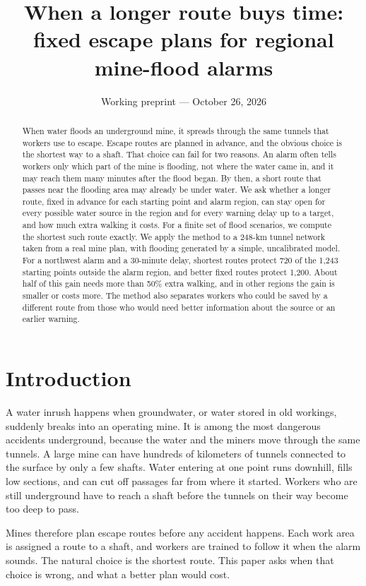 \documentclass[11pt,a4paper]{article}
\title{When a longer route buys time:\\fixed escape plans for regional mine-flood alarms}
\author{}
\date{Working preprint --- October 26, 2026}
\begin{document}
\maketitle
\begin{abstract}
When water floods an underground mine, it spreads through the same tunnels that workers use to escape. Escape routes are planned in advance, and the obvious choice is the shortest way to a shaft. That choice can fail for two reasons. An alarm often tells workers only which part of the mine is flooding, not where the water came in, and it may reach them many minutes after the flood began. By then, a short route that passes near the flooding area may already be under water. We ask whether a longer route, fixed in advance for each starting point and alarm region, can stay open for every possible water source in the region and for every warning delay up to a target, and how much extra walking it costs. For a finite set of flood scenarios, we compute the shortest such route exactly. We apply the method to a 248-km tunnel network taken from a real mine plan, with flooding generated by a simple, uncalibrated model. For a northwest alarm and a 30-minute delay, shortest routes protect 720 of the 1,243 starting points outside the alarm region, and better fixed routes protect 1,200. About half of this gain needs more than 50\% extra walking, and in other regions the gain is smaller or costs more. The method also separates workers who could be saved by a different route from those who would need better information about the source or an earlier warning.
\end{abstract}

\section{Introduction}
A water inrush happens when groundwater, or water stored in old workings, suddenly breaks into an operating mine. It is among the most dangerous accidents underground, because the water and the miners move through the same tunnels. A large mine can have hundreds of kilometers of tunnels connected to the surface by only a few shafts. Water entering at one point runs downhill, fills low sections, and can cut off passages far from where it started. Workers who are still underground have to reach a shaft before the tunnels on their way become too deep to pass.

Mines therefore plan escape routes before any accident happens. Each work area is assigned a route to a shaft, and workers are trained to follow it when the alarm sounds. The natural choice is the shortest route. This paper asks when that choice is wrong, and what a better plan would cost.
\end{document}
